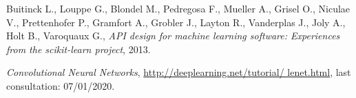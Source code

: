 \begin{thebibliography}{99}

Buitinck L., Louppe G., Blondel M., Pedregosa F., Mueller A., Grisel O., Niculae V., Prettenhofer P., Gramfort A., Grobler J., Layton R., Vanderplas J., Joly A., Holt B., Varoquaux G., \textit{API design for machine learning software: Experiences from the scikit-learn project}, 2013. 

 \textit{Convolutional Neural Networks}, \url{http://deeplearning.net/tutorial/ lenet.html}, last consultation: 07/01/2020.

\end{thebibliography}

